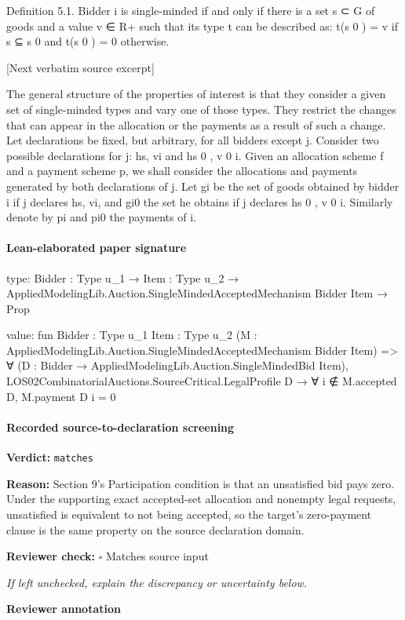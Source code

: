 \documentclass[10pt]{article}
\newcommand{\reviewerbox}{%
  \par\noindent\fbox{\parbox{0.96\linewidth}{\rule{0pt}{0.38in}}}\par
}
\newcommand{\reviewmatch}[1]{%
  \par\noindent\textbf{Reviewer check:} $\square$\; #1\par
  \noindent\emph{If left unchecked, explain the discrepancy or uncertainty below.}\par
}
\begin{document}
\begin{ReviewVerbatim}

Definition 5.1. Bidder i is single-minded if and only if there is a set s ⊂ G of
goods and a value v ∈ R+ such that its type t can be described as: t(s 0 ) = v if s ⊆ s 0
and t(s 0 ) = 0 otherwise.

[Next verbatim source excerpt]

The general structure of the properties of interest is that they consider a given
set of single-minded types and vary one of those types. They restrict the changes
that can appear in the allocation or the payments as a result of such a change.
Let declarations be fixed, but arbitrary, for all bidders except j. Consider two
possible declarations for j: hs, vi and hs 0 , v 0 i. Given an allocation scheme f and a
payment scheme p, we shall consider the allocations and payments generated by
both declarations of j. Let gi be the set of goods obtained by bidder i if j declares
hs, vi, and gi0 the set he obtains if j declares hs 0 , v 0 i. Similarly denote by pi and pi0
the payments of i.
\end{ReviewVerbatim}



\paragraph{Lean-elaborated paper signature}
\begin{ReviewVerbatim}
type:
{Bidder : Type u_1} → {Item : Type u_2} → AppliedModelingLib.Auction.SingleMindedAcceptedMechanism Bidder Item → Prop

value:
fun {Bidder : Type u_1} {Item : Type u_2} (M : AppliedModelingLib.Auction.SingleMindedAcceptedMechanism Bidder Item) =>
  ∀ (D : Bidder → AppliedModelingLib.Auction.SingleMindedBid Item),
    LOS02CombinatorialAuctions.SourceCritical.LegalProfile D → ∀ i ∉ M.accepted D, M.payment D i = 0
\end{ReviewVerbatim}


\paragraph{Recorded source-to-declaration screening}
\textbf{Verdict:} \texttt{matches}
\\
{\raggedright
\textbf{Reason:} Section 9's Participation condition is that an unsatisfied bid pays zero.\allowbreak{} Under the supporting exact accepted-\allowbreak{}set allocation and nonempty legal requests, unsatisfied is equivalent to not being accepted, so the target's zero-\allowbreak{}payment clause is the same property on the source declaration domain.\allowbreak{}
\par}
\reviewmatch{Matches source input}
\noindent\textbf{Reviewer annotation}\par
\reviewerbox
\clearpage
\hypertarget{paper-prerequisite-5b4a6cab608c3ed3}{}
\end{document}
